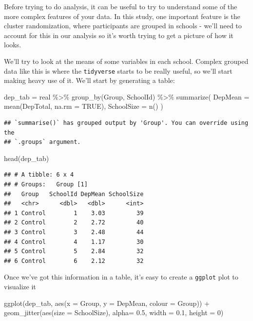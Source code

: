\documentclass[
]{book}
\newenvironment{Shaded}{\begin{snugshade}}{\end{snugshade}}
\newcommand{\AttributeTok}[1]{\textcolor[rgb]{0.77,0.63,0.00}{#1}}
\newcommand{\ConstantTok}[1]{\textcolor[rgb]{0.00,0.00,0.00}{#1}}
\newcommand{\DecValTok}[1]{\textcolor[rgb]{0.00,0.00,0.81}{#1}}
\newcommand{\FloatTok}[1]{\textcolor[rgb]{0.00,0.00,0.81}{#1}}
\newcommand{\FunctionTok}[1]{\textcolor[rgb]{0.00,0.00,0.00}{#1}}
\newcommand{\NormalTok}[1]{#1}
\newcommand{\OtherTok}[1]{\textcolor[rgb]{0.56,0.35,0.01}{#1}}
\newcommand{\SpecialCharTok}[1]{\textcolor[rgb]{0.00,0.00,0.00}{#1}}
\begin{document}
Before trying to do analysis, it can be useful to try
to understand some of the more complex features of your
data. In this study, one important feature is the
cluster randomization, where participants are grouped
in schools - we'll need to account for this in our analysis
so it's worth trying to get a picture of how it looks.

We'll try to look at the means of some variables in each
school. Complex grouped data like this is where the
\texttt{tidyverse} starts to be really useful, so we'll
start making heavy use of it. We'll start by generating
a table:

\begin{Shaded}
\begin{Highlighting}[]
\NormalTok{dep\_tab }\OtherTok{=}\NormalTok{ real }\SpecialCharTok{\%\textgreater{}\%}
  \FunctionTok{group\_by}\NormalTok{(Group, SchoolId) }\SpecialCharTok{\%\textgreater{}\%}
  \FunctionTok{summarize}\NormalTok{(}
    \AttributeTok{DepMean =} \FunctionTok{mean}\NormalTok{(DepTotal, }\AttributeTok{na.rm =} \ConstantTok{TRUE}\NormalTok{),}
    \AttributeTok{SchoolSize =} \FunctionTok{n}\NormalTok{()}
\NormalTok{  )}
\end{Highlighting}
\end{Shaded}

\begin{verbatim}
## `summarise()` has grouped output by 'Group'. You can override using the
## `.groups` argument.
\end{verbatim}

\begin{Shaded}
\begin{Highlighting}[]
\FunctionTok{head}\NormalTok{(dep\_tab)}
\end{Highlighting}
\end{Shaded}

\begin{verbatim}
## # A tibble: 6 x 4
## # Groups:   Group [1]
##   Group   SchoolId DepMean SchoolSize
##   <chr>      <dbl>   <dbl>      <int>
## 1 Control        1    3.03         39
## 2 Control        2    2.72         40
## 3 Control        3    2.48         44
## 4 Control        4    1.17         30
## 5 Control        5    2.84         32
## 6 Control        6    2.12         32
\end{verbatim}

Once we've got this information in a table, it's
easy to create a \texttt{ggplot} plot to visualize it

\begin{Shaded}
\begin{Highlighting}[]
\FunctionTok{ggplot}\NormalTok{(dep\_tab, }\FunctionTok{aes}\NormalTok{(}\AttributeTok{x =}\NormalTok{ Group, }\AttributeTok{y =}\NormalTok{ DepMean, }
                    \AttributeTok{colour =}\NormalTok{ Group)) }\SpecialCharTok{+}
  \FunctionTok{geom\_jitter}\NormalTok{(}\FunctionTok{aes}\NormalTok{(}\AttributeTok{size =}\NormalTok{ SchoolSize), }\AttributeTok{alpha=} \FloatTok{0.5}\NormalTok{,}
              \AttributeTok{width =} \FloatTok{0.1}\NormalTok{, }\AttributeTok{height =} \DecValTok{0}\NormalTok{)}
\end{Highlighting}
\end{Shaded}
\end{document}
